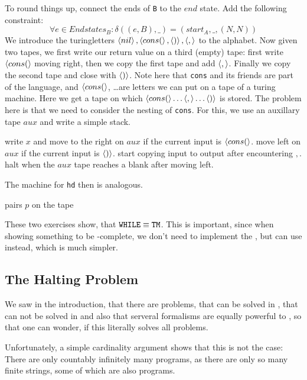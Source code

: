 \begin{Answer}
			To round things up, connect the ends of {\tt B} to the $end$ state.
		\subQuestion
			Add the following constraint:
			\[\forall e \in Endstates_B: \delta((e,B), \_)= (start_A, \_, (N, N))\]
	\Question
		\subQuestion We introduce the turingletters $\left< nil \right>, \left< cons( \right>,
			\left< ) \right>, \left< , \right>$ to the alphabet. Now given two tapes, we first 
			write our return value on a third (empty) tape: first write
			$\left< cons( \right>$ moving right, then we copy the first tape and add
			$\left< , \right>$. Finally we copy the second tape and close with $\left< ) \right>$.
			Note here that {\tt cons} and its friends are part of the \WHILE language,
			and $\left< cons( \right>$, \dots are letters we can put on a tape of a turing
			machine. 
			\subQuestion Here we get a tape on which 
			$\left< cons( \right>\dots\left< , \right>\dots\left< ) \right>$ is stored. The problem here is 
			that we need to consider the nesting of {\tt cons}. For this, we use an 
			auxillary tape $aux$ and write a simple stack. 
		\begin{algorithmic}[1]
			\State write $x$ and move to the right on $aux$ if the current input is $\left< cons( \right>$.
			\State move left on $aux$ if the current input is $\left< ) \right>$.
			\State start copying input to output after encountering $,$.
			\State halt when the $aux$ tape reaches a blank after moving left.
		\end{algorithmic}
			The machine for {\tt hd} then is analogous.
	\subQuestion 
		\begin{algorithmic}[1]
			\ForAll pairs $p$ on the tape
			\EndFor
		\end{algorithmic}

\end{Answer}

These two exercises show, that $\mathtt{WHILE}\equiv\mathtt{TM}$. This is important, since 
when showing something to be \WHILE-complete, we don't need to implement the 
\WHILE, but can use \TM instead, which is much simpler.

\subsection{The Halting Problem} \label{sec:halt}
We saw in the introduction, that there are problems, that can be solved in
\WHILE, that can not be solved in \FOR and also that serveral formalisms are
equally powerful to \WHILE, so that one can wonder, if this literally solves
all problems.

Unfortunately, a simple cardinality argument shows that this is not the case: 
There are only countably infinitely many \WHILE programs, as there are only 
so many finite strings, some of which are also \WHILE programs.

